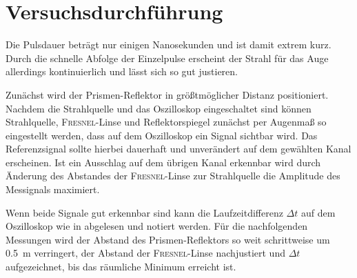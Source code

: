 \chapter{Versuchsdurchführung}
Die Pulsdauer beträgt nur einigen Nanosekunden und ist damit extrem kurz. Durch die schnelle Abfolge der Einzelpulse erscheint
der Strahl für das Auge allerdings kontinuierlich und lässt sich so gut justieren.\par
Zunächst wird der Prismen-Reflektor in größtmöglicher Distanz positioniert. Nachdem die Strahlquelle und das Oszilloskop
eingeschaltet sind können Strahlquelle, \textsc{Fresnel}-Linse und Reflektorspiegel zunächst per Augenmaß so eingestellt werden,
dass auf dem Oszilloskop ein Signal sichtbar wird. Das Referenzsignal sollte hierbei dauerhaft und unverändert auf dem gewählten
Kanal erscheinen. Ist ein Ausschlag auf dem übrigen Kanal erkennbar wird durch Änderung des Abstandes der \textsc{Fresnel}-Linse
zur Strahlquelle die Amplitude des Messignals maximiert.\par
Wenn beide Signale gut erkennbar sind kann die Laufzeitdifferenz \(\Delta t\) auf dem Oszilloskop wie in 
abgelesen und notiert werden. Für die nachfolgenden Messungen wird der Abstand des Prismen-Reflektors so weit schrittweise um \SI{0,5}{m}
verringert, der Abstand der \textsc{Fresnel}-Linse nachjustiert und \(\Delta t\) aufgezeichnet, bis das räumliche Minimum erreicht ist.
%